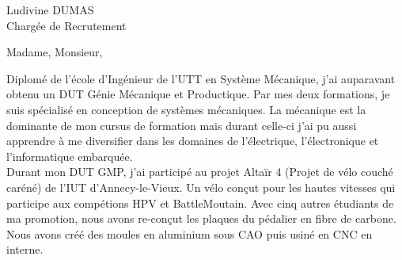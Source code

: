 \documentclass[a4paper,10pt,firstfoot=false]{scrlttr2}
\begin{document}


\begin{letter}{Ludivine DUMAS \\ Chargée de Recrutement}

\pagestyle{empty}
\opening{Madame, Monsieur,}


Diplomé de l’école d’Ingénieur de l’UTT en Système Mécanique, j’ai auparavant obtenu un DUT Génie Mécanique et Productique. Par mes deux formations, je suis spécialisé en conception de systèmes mécaniques. La mécanique est la dominante de mon cursus de formation mais durant celle-ci j’ai pu aussi apprendre à me diversifier dans les domaines de l’électrique, l’électronique et l’informatique embarquée.\\

Durant mon DUT GMP, j’ai participé au projet Altaïr 4 (Projet de vélo couché caréné) de l’IUT d’Annecy-le-Vieux. Un vélo conçut pour les hautes vitesses qui participe aux compétions HPV et BattleMoutain. Avec cinq autres étudiants de ma promotion, nous avons re-conçut les plaques du pédalier en fibre de carbone. Nous avons créé des moules en aluminium sous CAO puis usiné en CNC en interne.\\



\end{letter}
\end{document}
